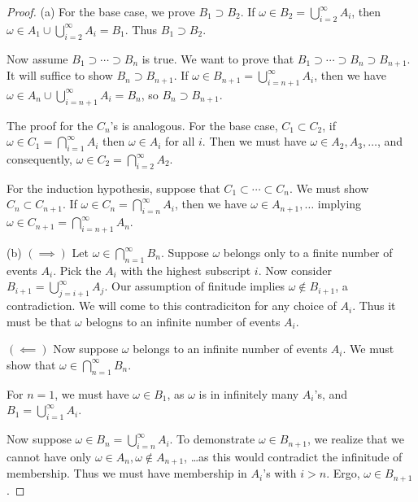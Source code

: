 \documentclass[a4paper]{article}
\begin{document}
\begin{proof}[Proof] 
	(a) For the base case, we prove \(B_{1} \supset B_{2}\). If \(\omega \in  B_{2} = \bigcup_{i=2}^{\infty} A_{i} \), then \(\omega \in A_{1} \cup \bigcup_{i=2}^{\infty} A_{i} = B_{1}\). Thus \(B_{1} \supset B_{2}.\)

Now assume \(B_{1} \supset \cdots \supset B_{n} \) is true. We want to prove that \(B_{1} \supset \cdots \supset B_{n} \supset B_{n+1}\). It will suffice to show \(B_{n} \supset B_{n+1}\). If \(\omega \in B_{n+1} = \bigcup_{i = n+1}^{\infty} A_{i} \), then we have \(\omega \in  A_{n} \cup \bigcup_{i = n+1}^{\infty} A_{i} = B_{n} \), so \(B_{n} \supset B_{n+1}\).

The proof for the \(C_{n}\)'s is analogous. For the base case, \(C_{1} \subset C_{2}\), if \(\omega \in C_{1} = \bigcap_{i=1}^{\infty} A_{i} \) then \(\omega \in A_{i}\) for all \(i\). Then we must have \(\omega \in A_{2}, A_{3}, \dots\), and consequently, \(\omega \in C_{2} = \bigcap_{i=2}^{\infty} A_{2} \).

For the induction hypothesis, suppose that \(C_{1} \subset \cdots \subset C_{n}	\). We must show \(C_{n} \subset C_{n+1}\). If \(\omega \in C_{n} = \bigcap_{i=n}^{\infty} A_{i} \), then we have \(\omega \in A_{n+1},\dots\) implying \(\omega \in C_{n+1} = \bigcap_{i=n+1}^{\infty} A_{n} \).
\vspace{12pt}
\par (b) \((\implies)\) Let \(\omega \in \bigcap_{n=1}^{\infty} B_{n} \). Suppose \(\omega\) belongs only to a finite number of events \(A_{i}\). Pick the \(A_{i}\) with the highest subscript \(i\). Now consider \(B_{i+1} = \bigcup_{j = i+1}^{\infty} A_{j} \). Our assumption of finitude implies \(\omega \not\in B_{i+1}\), a contradiction. We will come to this contradiciton for any choice of \(A_{i}\). Thus it must be that \(\omega\) belogns to an infinite number of events \(A_{i}\).

\(( \impliedby )\) Now suppose \(\omega\) belongs to an infinite number of events \(A_{i}\). We must show that \(\omega \in \bigcap_{n=1}^{\infty} B_{n}\).

For \(n=1\), we must have \(\omega \in  B_{1}\), as \(\omega\) is in infinitely many \(A_{i}\)'s, and \(B_{1} = \bigcup_{i=1}^{\infty} A_{i} \). 

Now suppose \(\omega \in B_{n} = \bigcup_{i=n}^{\infty} A_{i}\). To demonstrate \(\omega \in B_{n+1}\), we realize that we cannot have only \(\omega \in A_{n}, \omega \not\in A_{n+1}\), \dots as this would contradict the infinitude of membership. Thus we must have membership in \(A_{i}\)'s with \(i > n\). Ergo, \(\omega \in B_{n+1}\).


\end{proof}
\end{document}
